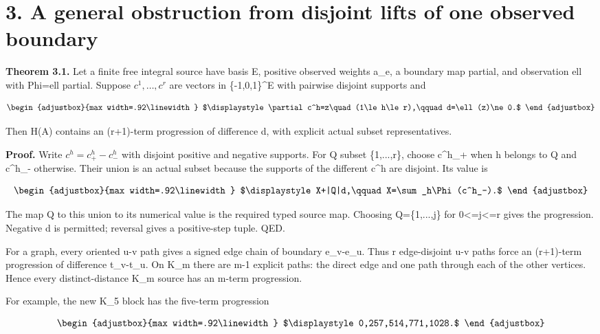 \section{3. A general obstruction from disjoint lifts of one observed boundary}\label{n08-a-general-obstruction-from-disjoint-lifts-of-one-observed-boundary}

\textbf{Theorem 3.1.} Let a finite free integral source have basis E, positive observed weights a\_e, a boundary map partial, and observation ell with Phi=ell partial. Suppose \(c^1,\ldots,c^r\) are vectors in \{-1,0,1\}\^{}E with pairwise disjoint supports and

\[
\begin{adjustbox}{max width=.92\linewidth}
$\displaystyle \partial c^h=z\quad(1\le h\le r),\qquad d=\ell(z)\ne0.$
\end{adjustbox}
\]

Then H(A) contains an (r+1)-term progression of difference d, with explicit actual subset representatives.

\textbf{Proof.} Write \(c^h=c^h_{+}-c^h_{-}\) with disjoint positive and negative supports. For Q subset \{1,...,r\}, choose c\^{}h\_+ when h belongs to Q and c\^{}h\_- otherwise. Their union is an actual subset because the supports of the different c\^{}h are disjoint. Its value is

\[
\begin{adjustbox}{max width=.92\linewidth}
$\displaystyle X+|Q|d,\qquad X=\sum_h\Phi(c^h_-).$
\end{adjustbox}
\]

The map Q to this union to its numerical value is the required typed source map. Choosing Q=\{1,...,j\} for 0\textless=j\textless=r gives the progression. Negative d is permitted; reversal gives a positive-step tuple. QED.

For a graph, every oriented u-v path gives a signed edge chain of boundary e\_v-e\_u. Thus r edge-disjoint u-v paths force an (r+1)-term progression of difference t\_v-t\_u. On K\_m there are m-1 explicit paths: the direct edge and one path through each of the other vertices. Hence every distinct-distance K\_m source has an m-term progression.

For example, the new K\_5 block has the five-term progression

\[
\begin{adjustbox}{max width=.92\linewidth}
$\displaystyle 0,257,514,771,1028.$
\end{adjustbox}
\]


